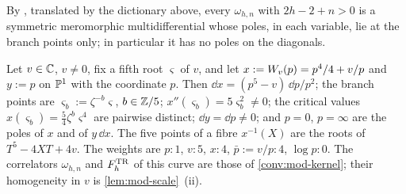 By \cite[Thm.~4.2, Thm.~4.6]{Eynard:2007kz}, translated by the dictionary above, every $\omega_{h,n}$ with $2h-2+n>0$ is a symmetric meromorphic multidifferential whose poles, in each variable, lie at the branch points only; in particular it has no poles on the diagonals.

\begin{defn}
\label{def:mod-curve}
Let $v\in\mathbb{C}$, $v\neq 0$, fix a fifth root $\varsigma$ of $v$, and let $x:=W_{v}(p)=p^4/4+v/p$ and $y:=p$ on $\mathbb{P}^1$ with the coordinate $p$. Then $\dd x=(p^5-v)\,\dd p/p^2$; the branch points are $\varsigma_b:=\zeta^{-b}\varsigma$, $b\in\mathbb{Z}/5$; $x''(\varsigma_b)=5\varsigma_b^2\neq 0$; the critical values $x(\varsigma_b)=\frac54\zeta^b\varsigma^4$ are pairwise distinct; $\dd y=\dd p\neq 0$; and $p=0$, $p=\infty$ are the poles of $x$ and of $y\,\dd x$. The five points of a fibre $x^{-1}(X)$ are the roots of $T^5-4XT+4v$. The weights are $p:1$, $v:5$, $x:4$, $\bar p:=v/p:4$, $\log p:0$. The correlators $\omega_{h,n}$ and $F^{\mathrm{TR}}_h$ of this curve are those of \cref{conv:mod-kernel}; their homogeneity in $v$ is \cref{lem:mod-scale}~(ii).
\end{defn}

